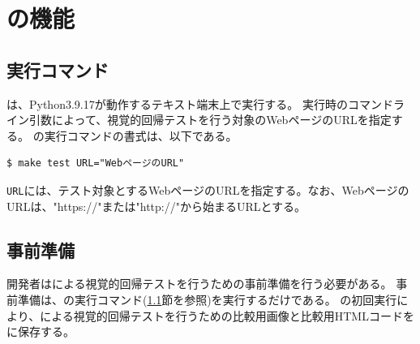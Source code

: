 \section{\toolName の機能}
\subsection{実行コマンド}\label{subsec:MixVRT_execution}
\toolName は、Python3.9.17\cite{Python}が動作するテキスト端末上で実行する。
\toolName 実行時のコマンドライン引数によって、視覚的回帰テストを行う対象のWebページのURLを指定する。
\toolName の実行コマンドの書式は、以下である。
\begin{lstlisting}[label=list:command,frame=none,numbers=none,basicstyle={\normalsize \ttfamily \color[gray]{.15}}]
  $ make test URL="WebページのURL"
 \end{lstlisting}
{\tt URL}には、テスト対象とするWebページのURLを指定する。なお、WebページのURLは、"https://"または"http://"から始まるURLとする。

\subsection{事前準備}\label{subsec:MixVRT_preparation}
開発者は\toolName による視覚的回帰テストを行うための事前準備を行う必要がある。
事前準備は、\toolName の実行コマンド(\ref{subsec:MixVRT_execution}節を参照)を実行するだけである。
\toolName の初回実行により、\toolName による視覚的回帰テストを行うための比較用画像と比較用HTMLコードを\toolName に保存する。
